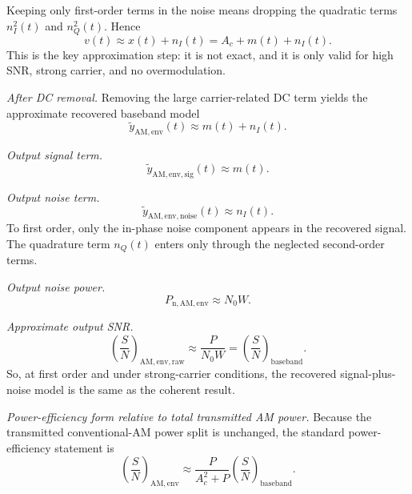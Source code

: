 \begin{tcolorbox}[breakable, colback=cyan!4!white, colframe=cyan!60!black,
title={\textbf{Intuition: Step-by-Step Output SNR Models Under AWGN}}]
Keeping only first-order terms in the noise means dropping the quadratic terms
$n_I^2(t)$ and $n_Q^2(t)$. Hence
\begin{equation}
v(t)\approx x(t)+n_I(t)=A_c+m(t)+n_I(t).
\label{eq:lab2_awgn_env_first_order}
\end{equation}
This is the key approximation step: it is not exact, and it is only valid for
high SNR, strong carrier, and no overmodulation.

\emph{After DC removal.}
Removing the large carrier-related DC term yields the approximate recovered
baseband model
\begin{equation}
\tilde{y}_{\mathrm{AM,env}}(t)\approx m(t)+n_I(t).
\end{equation}

\emph{Output signal term.}
\begin{equation}
\tilde{y}_{\mathrm{AM,env,sig}}(t)\approx m(t).
\end{equation}

\emph{Output noise term.}
\begin{equation}
\tilde{y}_{\mathrm{AM,env,noise}}(t)\approx n_I(t).
\end{equation}
To first order, only the in-phase noise component appears in the recovered
signal. The quadrature term $n_Q(t)$ enters only through the neglected
second-order terms.

\emph{Output noise power.}
\begin{equation}
P_{\mathrm{n,AM,env}}\approx N_0 W.
\end{equation}

\emph{Approximate output SNR.}
\begin{equation}
\left(\frac{S}{N}\right)_{\mathrm{AM,env,raw}}
\approx
\frac{P}{N_0 W}
=
\left(\frac{S}{N}\right)_{\mathrm{baseband}}.
\end{equation}
So, at first order and under strong-carrier conditions, the recovered
signal-plus-noise model is the same as the coherent result.

\emph{Power-efficiency form relative to total transmitted AM power.}
Because the transmitted conventional-AM power split is unchanged, the standard
power-efficiency statement is
\begin{equation}
\left(\frac{S}{N}\right)_{\mathrm{AM,env}}
\approx
\frac{P}{A_c^2+P}
\left(\frac{S}{N}\right)_{\mathrm{baseband}}.
\label{eq:lab2_awgn_am_env_efficiency}
\end{equation}


\end{tcolorbox}
